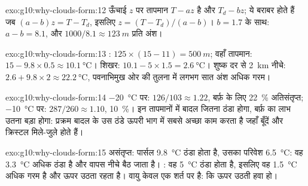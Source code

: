 \begin{solution}{exo:g10:why-clouds-form:12}
ऊँचाई $z$ पर तापमान $T - a z$ है और  $T_d - b z$;
ये बराबर होते हैं जब $(a - b) z = T - T_d$, इसलिए $z = (T - T_d)/(a - b)$।
$b = 1.7$ के साथ: $a - b = 8.1$, और $1000/8.1 \approx \qty{123}{m}$ प्रति अंश।
\end{solution}

\begin{solution}{exo:g10:why-clouds-form:13}
: $125 \times (15 - 11) = \qty{500}{m}$; वहाँ तापमान:
$15 - 9.8 \times 0.5 \approx \qty{10.1}{\degreeCelsius}$। शिखर: $10.1 - 5
\times 1.5 = \qty{2.6}{\degreeCelsius}$। शुष्क दर से \qty{2}{km} नीचे:
$2.6 + 9.8 \times 2 \approx \qty{22.2}{\degreeCelsius}$, पवनाभिमुख ओर की तुलना में लगभग सात अंश
अधिक गरम।
\end{solution}

\begin{solution}{exo:g10:why-clouds-form:14}
\qty{-20}{\degreeCelsius} पर: $126/103 \approx 1.22$, बर्फ़ के लिए \qty{22}{\percent}
अतिसंतृप्त; \qty{-10}{\degreeCelsius} पर: $287/260 \approx
1.10$, \qty{10}{\percent}। इन तापमानों में बादल जितना ठंडा होगा, बर्फ़ का लाभ
उतना बड़ा होगा: प्रक्रम बादल के उस ठंडे ऊपरी भाग में सबसे अच्छा काम करता है जहाँ
बूँदें और क्रिस्टल मिले-जुले होते हैं।
\end{solution}

\begin{solution}{exo:g10:why-clouds-form:15}
असंतृप्त: पार्सल \qty{9.8}{\degreeCelsius} ठंडा होता है, उसका परिवेश
\qty{6.5}{\degreeCelsius}: वह \qty{3.3}{\degreeCelsius} अधिक ठंडा है और
वापस नीचे बैठ जाता है। : वह \qty{5}{\degreeCelsius} ठंडा होता है, इसलिए वह
\qty{1.5}{\degreeCelsius} अधिक गरम है और ऊपर उठता रहता है। वायु केवल एक शर्त पर
 है: कि ऊपर उठती हवा  हो।
\end{solution}

